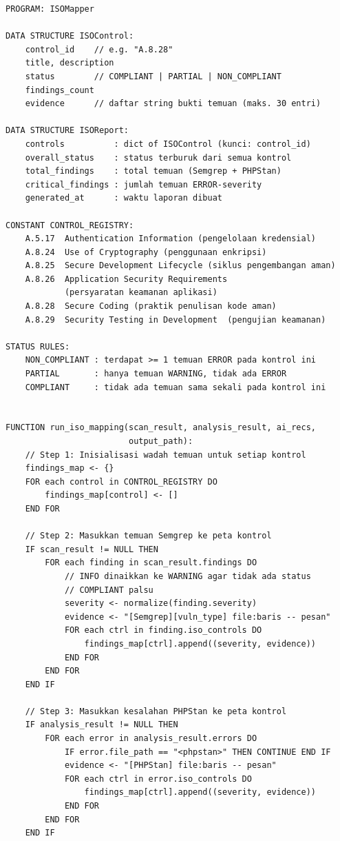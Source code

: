 \begin{lstlisting}[style=pseudocodestyle]
PROGRAM: ISOMapper

DATA STRUCTURE ISOControl:
    control_id    // e.g. "A.8.28"
    title, description
    status        // COMPLIANT | PARTIAL | NON_COMPLIANT
    findings_count
    evidence      // daftar string bukti temuan (maks. 30 entri)

DATA STRUCTURE ISOReport:
    controls          : dict of ISOControl (kunci: control_id)
    overall_status    : status terburuk dari semua kontrol
    total_findings    : total temuan (Semgrep + PHPStan)
    critical_findings : jumlah temuan ERROR-severity
    generated_at      : waktu laporan dibuat

CONSTANT CONTROL_REGISTRY:
    A.5.17  Authentication Information (pengelolaan kredensial)
    A.8.24  Use of Cryptography (penggunaan enkripsi)
    A.8.25  Secure Development Lifecycle (siklus pengembangan aman)
    A.8.26  Application Security Requirements 
            (persyaratan keamanan aplikasi)
    A.8.28  Secure Coding (praktik penulisan kode aman)
    A.8.29  Security Testing in Development  (pengujian keamanan)

STATUS RULES:
    NON_COMPLIANT : terdapat >= 1 temuan ERROR pada kontrol ini
    PARTIAL       : hanya temuan WARNING, tidak ada ERROR
    COMPLIANT     : tidak ada temuan sama sekali pada kontrol ini


FUNCTION run_iso_mapping(scan_result, analysis_result, ai_recs, 
                         output_path):
    // Step 1: Inisialisasi wadah temuan untuk setiap kontrol
    findings_map <- {}
    FOR each control in CONTROL_REGISTRY DO
        findings_map[control] <- []
    END FOR

    // Step 2: Masukkan temuan Semgrep ke peta kontrol
    IF scan_result != NULL THEN
        FOR each finding in scan_result.findings DO
            // INFO dinaikkan ke WARNING agar tidak ada status 
            // COMPLIANT palsu
            severity <- normalize(finding.severity)
            evidence <- "[Semgrep][vuln_type] file:baris -- pesan"
            FOR each ctrl in finding.iso_controls DO
                findings_map[ctrl].append((severity, evidence))
            END FOR
        END FOR
    END IF

    // Step 3: Masukkan kesalahan PHPStan ke peta kontrol
    IF analysis_result != NULL THEN
        FOR each error in analysis_result.errors DO
            IF error.file_path == "<phpstan>" THEN CONTINUE END IF
            evidence <- "[PHPStan] file:baris -- pesan"
            FOR each ctrl in error.iso_controls DO
                findings_map[ctrl].append((severity, evidence))
            END FOR
        END FOR
    END IF


\end{lstlisting}
